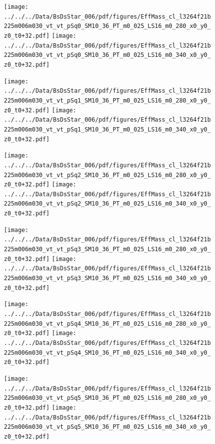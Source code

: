 \documentclass[a4paper,10pt]{article}
\begin{document}
\begin{figure}[p]
 \texttt{[image: ../../../Data/BsDsStar\_006/pdf/figures/EffMass\_cl\_l3264f21b225m006m030\_vt\_vt\_pSq0\_SM10\_36\_PT\_m0\_025\_LS16\_m0\_280\_x0\_y0\_z0\_t0+32.pdf]} 
 \texttt{[image: ../../../Data/BsDsStar\_006/pdf/figures/EffMass\_cl\_l3264f21b225m006m030\_vt\_vt\_pSq0\_SM10\_36\_PT\_m0\_025\_LS16\_m0\_340\_x0\_y0\_z0\_t0+32.pdf]} 
 \end{figure}
\begin{figure}[p]
 \texttt{[image: ../../../Data/BsDsStar\_006/pdf/figures/EffMass\_cl\_l3264f21b225m006m030\_vt\_vt\_pSq1\_SM10\_36\_PT\_m0\_025\_LS16\_m0\_280\_x0\_y0\_z0\_t0+32.pdf]} 
 \texttt{[image: ../../../Data/BsDsStar\_006/pdf/figures/EffMass\_cl\_l3264f21b225m006m030\_vt\_vt\_pSq1\_SM10\_36\_PT\_m0\_025\_LS16\_m0\_340\_x0\_y0\_z0\_t0+32.pdf]} 
 \end{figure}
\begin{figure}[p]
 \texttt{[image: ../../../Data/BsDsStar\_006/pdf/figures/EffMass\_cl\_l3264f21b225m006m030\_vt\_vt\_pSq2\_SM10\_36\_PT\_m0\_025\_LS16\_m0\_280\_x0\_y0\_z0\_t0+32.pdf]} 
 \texttt{[image: ../../../Data/BsDsStar\_006/pdf/figures/EffMass\_cl\_l3264f21b225m006m030\_vt\_vt\_pSq2\_SM10\_36\_PT\_m0\_025\_LS16\_m0\_340\_x0\_y0\_z0\_t0+32.pdf]} 
 \end{figure}
\clearpage
\begin{figure}[p]
 \texttt{[image: ../../../Data/BsDsStar\_006/pdf/figures/EffMass\_cl\_l3264f21b225m006m030\_vt\_vt\_pSq3\_SM10\_36\_PT\_m0\_025\_LS16\_m0\_280\_x0\_y0\_z0\_t0+32.pdf]} 
 \texttt{[image: ../../../Data/BsDsStar\_006/pdf/figures/EffMass\_cl\_l3264f21b225m006m030\_vt\_vt\_pSq3\_SM10\_36\_PT\_m0\_025\_LS16\_m0\_340\_x0\_y0\_z0\_t0+32.pdf]} 
 \end{figure}
\begin{figure}[p]
 \texttt{[image: ../../../Data/BsDsStar\_006/pdf/figures/EffMass\_cl\_l3264f21b225m006m030\_vt\_vt\_pSq4\_SM10\_36\_PT\_m0\_025\_LS16\_m0\_280\_x0\_y0\_z0\_t0+32.pdf]} 
 \texttt{[image: ../../../Data/BsDsStar\_006/pdf/figures/EffMass\_cl\_l3264f21b225m006m030\_vt\_vt\_pSq4\_SM10\_36\_PT\_m0\_025\_LS16\_m0\_340\_x0\_y0\_z0\_t0+32.pdf]} 
 \end{figure}
\begin{figure}[p]
 \texttt{[image: ../../../Data/BsDsStar\_006/pdf/figures/EffMass\_cl\_l3264f21b225m006m030\_vt\_vt\_pSq5\_SM10\_36\_PT\_m0\_025\_LS16\_m0\_280\_x0\_y0\_z0\_t0+32.pdf]} 
 \texttt{[image: ../../../Data/BsDsStar\_006/pdf/figures/EffMass\_cl\_l3264f21b225m006m030\_vt\_vt\_pSq5\_SM10\_36\_PT\_m0\_025\_LS16\_m0\_340\_x0\_y0\_z0\_t0+32.pdf]} 
 \end{figure}
\clearpage
\clearpage
\end{document}
